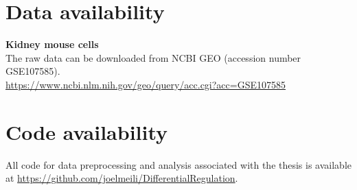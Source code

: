 \section{Data availability}

\noindent\textbf{Kidney mouse cells} \\
The raw data can be downloaded from NCBI GEO (accession number GSE107585). \\ 
\url{https://www.ncbi.nlm.nih.gov/geo/query/acc.cgi?acc=GSE107585} \\

\section{Code availability}
All code for data preprocessing and analysis associated with the thesis is available at \url{https://github.com/joelmeili/DifferentialRegulation}.
